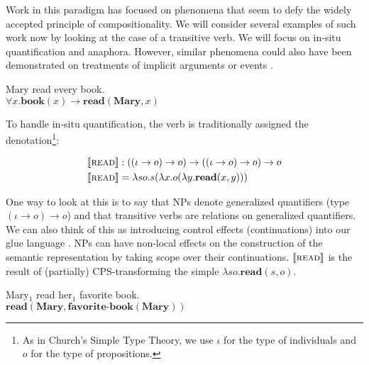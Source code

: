 \documentclass[a4paper,11pt]{easychair}
\newcommand{\sem}[1]{\llbracket #1 \rrbracket}
\begin{document}
Work in this paradigm has focused on phenomena that seem to defy the widely
accepted principle of compositionality. We will consider several examples of
such work now by looking at the case of a transitive verb. We will focus on
in-situ quantification and anaphora. However, similar phenomena could also
have been demonstrated on treatments of implicit arguments
\citep{blom2012implicit} or events \citep{qian2011event}.


\begin{exe}
  \ex \label{ex:quantification} Mary read every book. \\
  $\forall x. \textbf{book}(x) \to \textbf{read}(\textbf{Mary}, x)$
\end{exe}

To handle in-situ quantification, the verb is traditionally assigned the
denotation\footnote{As in Church's Simple Type Theory, we use
  $\iota$ for the type of individuals and $o$ for the type of propositions.}:

\vspace{-4mm}

\begin{align*}
  \sem{\textsc{read}} & : ((\iota \to o) \to o) \to ((\iota \to o) \to o) \to
  o \\
  \sem{\textsc{read}} & = \lambda s o. s (\lambda x. o (\lambda
  y. \textbf{read}(x, y)))
\end{align*}

One way to look at this is to say that NPs denote generalized quantifiers
(type $(\iota \to o) \to o$) and that transitive verbs are relations on
generalized quantifiers. We can also think of this as introducing control
effects (continuations) into our glue language
\citep{barker2002continuations}. NPs can have non-local effects on the
construction of the semantic representation by taking scope over their
continuations. $\sem{\textsc{read}}$ is the result of (partially)
CPS-transforming the simple $\lambda s o. \textbf{read}(s, o)$.


\begin{exe}
  \ex \label{ex:anaphora} Mary$_1$ read her$_1$ favorite book. \\
  $\textbf{read}(\textbf{Mary}, \textbf{favorite-book}(\textbf{Mary}))$
\end{exe}
\end{document}
